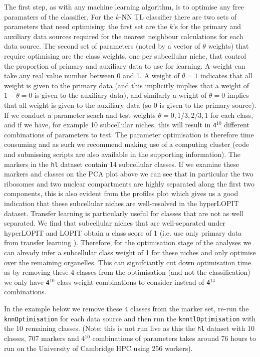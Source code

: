 The first step, as with any machine learning algorithm, is to optimise
any free paramaters of the classifier. For the $k$-NN TL classifier
there are two sets of parameters that need optimising: the first set
are the $k$'s for the primary and auxiliary data sources required for
the nearest neighbour calculations for each data source. The second
set of parameters (noted by a vector of $\theta$ weights) that require
optimising are the class weights, one per subcellular niche, that
control the proportion of primary and auxiliary data to use for
learning. A weight can take any real value number between 0 and 1. A
weight of $\theta = 1$ indicates that all weight is given to the
primary data (and this implicitly implies that a weight of
$1 - \theta = 0$ is given to the auxiliary data), and similarly a
weight of $\theta = 0$ implies that all weight is given to the
auxiliary data (so 0 is given to the primary source). If we conduct a
parameter seach and test weights $\theta = {0, 1/3, 2/3, 1}$ for each
class, and if we have, for example 10 subcellular niches, this will
result in \texttt{4$^{10}$} different combinations of parameters to
test. The parameter optimisation is therefore time consuming and as
such we recommend making use of a computing cluster (code and
submissing scripts are also available in the supporting
information). The markers in the \texttt{hl} dataset contain 14
subcellular classes. If we examine these markers and classes on the
PCA plot above we can see that in particular the two ribosomes and two
nuclear compartments are highly separated along the first two
components, this is also evident from the profiles plot which gives us
a good indication that these subcellular niches are well-resolved in
the hyperLOPIT dataset. Transfer learning is particularly useful for
classes that are not as well separated. We find that subcellular
niches that are well-separated under hyperLOPIT and LOPIT obtain a
class score of 1 (i.e. use only primary data from transfer learning
\cite{Breckels:2016}). Therefore, for the optimisation stage of the
analyses we can already infer a subcellular class weight of 1 for
these niches and only optimise over the remaining organelles.  This
can signifciantly cut down optimisation time as by removing these 4
classes from the optimisation (and not the classification) we only
have \texttt{4$^{10}$} class weight combinations to consider instead
of \texttt{4$^{14}$} combinations.

In the example below we remove these 4 classes from the marker set,
re-run the \texttt{knnOptimisation} for each data source and then run
the \texttt{knntlOptimisation} with the 10 remaining classes. (Note:
this is not run live as this the \texttt{hl} dataset with 10 classes,
707 markers and 4$^{10}$ combinations of parameters takes around 76
hours to run on the University of Cambridge HPC using 256 workers).

